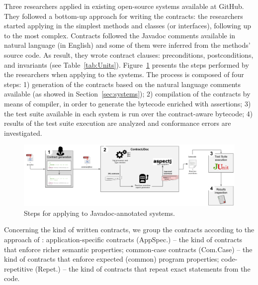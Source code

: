 Three researchers applied \contractjdoc{} in \totalSystems{} existing open-source systems
available at GitHub. They followed a bottom-up approach for
writing the \contractjdoc{} contracts: the researchers started applying
\contractjdoc{} in the simplest methods and classes (or interfaces), following
up to the most complex. Contracts followed the Javadoc comments available in
natural language (in English) and some of them were inferred from the methods'
source code.
As result, they wrote \totalClauses{} contract clauses:
\totalPre{} preconditions, \totalPost{} postconditions, and \totalInv{} invariants (see
Table~\ref{tab:Units}).
Figure~\ref{fig:applicationProcess} presents the steps performed by the researchers when applying
\contractjdoc{} to the systems. The process is composed of four steps: 1) generation of the
contracts based on the natural language comments available (as showed in
Section~\ref{sec:systems}); 2) compilation of the contracts by means of
\contractjdocCompiler{} compiler, in order to generate the bytecode enriched
with assertions; 3) the test suite available in each system is run over the
contract-aware bytecode; 4) results of the test suite execution are analyzed and
conformance errors are investigated.

\begin{figure}[h]
\centering
\includegraphics[width=1.0\textwidth]{figs/ContractJDocProcess}
\caption{Steps for applying \contractjdoc{} to Javadoc-annotated systems.}
\label{fig:applicationProcess}
\end{figure}

Concerning the kind of written contracts, we group the contracts according to
the approach of \cite{typeContracts}: application-specific contracts
(AppSpec.) -- the kind of contracts that enforce richer semantic properties;
 common-case contracts (Com.Case) -- the kind of contracts that enforce
expected (common) program properties;
code-repetitive (Repet.) -- the kind of
contracts that repeat exact statements from the code.

